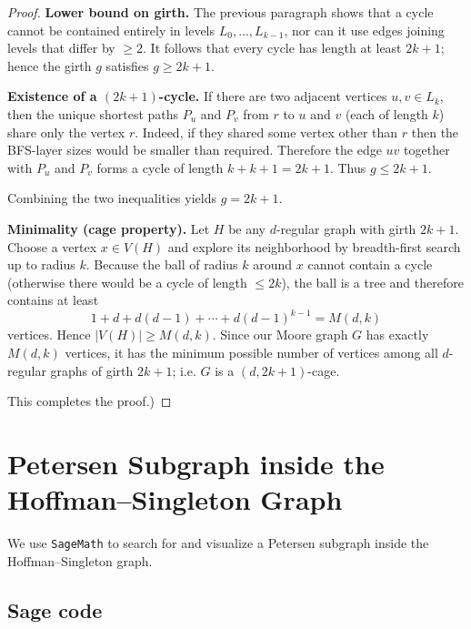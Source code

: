 \documentclass[12pt,a4paper,openany]{book}
\begin{document}
\begin{proof}
\medskip

\textbf{Lower bound on girth.} The previous paragraph shows that a cycle cannot be contained entirely in levels \(L_0,\dots,L_{k-1}\), nor can it use edges joining levels that differ by $\ge2$. It follows that every cycle has length at least \(2k+1\); hence the girth \(g\) satisfies \(g\ge 2k+1\).

\medskip

\textbf{Existence of a $(2k+1)$-cycle.} If there are two adjacent vertices \(u,v\in L_k\), then the unique shortest paths \(P_u\) and \(P_v\) from \(r\) to \(u\) and \(v\) (each of length \(k\)) share only the vertex \(r\). Indeed, if they shared some vertex other than \(r\) then the BFS-layer sizes would be smaller than required. Therefore the edge \(uv\) together with \(P_u\) and \(P_v\) forms a cycle of length \(k+k+1=2k+1\). Thus \(g\le 2k+1\).

Combining the two inequalities yields \(g=2k+1\).

\medskip

\textbf{Minimality (cage property).} Let \(H\) be any \(d\)-regular graph with girth \(2k+1\). Choose a vertex \(x\in V(H)\) and explore its neighborhood by breadth-first search up to radius \(k\). Because the ball of radius \(k\) around \(x\) cannot contain a cycle (otherwise there would be a cycle of length \(\le 2k\)), the ball is a tree and therefore contains at least
\[
1+d+d(d-1)+\cdots+d(d-1)^{k-1}=M(d,k)
\]
vertices. Hence \(|V(H)|\ge M(d,k)\). Since our Moore graph \(G\) has exactly \(M(d,k)\) vertices, it has the minimum possible number of vertices among all \(d\)-regular graphs of girth \(2k+1\); i.e. \(G\) is a \((d,2k+1)\)-cage.

This completes the proof.)
\end{proof}



\section*{Petersen Subgraph inside the Hoffman–Singleton Graph}

We use \texttt{SageMath} to search for and visualize a Petersen subgraph inside the Hoffman–Singleton graph.

\subsection*{Sage code}
\end{document}
